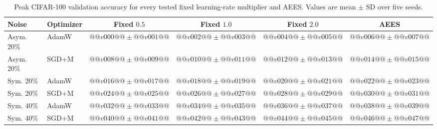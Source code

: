 \begin{table}[H]
\centering
\caption{Peak CIFAR-100 validation accuracy for every tested fixed
learning-rate multiplier and AEES. Values are mean $\pm$ SD over five seeds.}
\label{tab:appendix-all-fixed}
\scriptsize
\setlength{\tabcolsep}{3.0pt}
\renewcommand{\arraystretch}{1.03}
\begin{tabular}{llcccc}
\toprule
Noise & Optimizer & Fixed $0.5$ & Fixed $1.0$ & Fixed $2.0$ & AEES \\
\midrule
Asym. 20\% & AdamW & $@@v000@@\pm@@v001@@$ & $@@v002@@\pm@@v003@@$ & $@@v004@@\pm@@v005@@$ & $@@v006@@\pm@@v007@@$ \\
Asym. 20\% & SGD+M & $@@v008@@\pm@@v009@@$ & $@@v010@@\pm@@v011@@$ & $@@v012@@\pm@@v013@@$ & $@@v014@@\pm@@v015@@$ \\
Sym. 20\% & AdamW & $@@v016@@\pm@@v017@@$ & $@@v018@@\pm@@v019@@$ & $@@v020@@\pm@@v021@@$ & $@@v022@@\pm@@v023@@$ \\
Sym. 20\% & SGD+M & $@@v024@@\pm@@v025@@$ & $@@v026@@\pm@@v027@@$ & $@@v028@@\pm@@v029@@$ & $@@v030@@\pm@@v031@@$ \\
Sym. 40\% & AdamW & $@@v032@@\pm@@v033@@$ & $@@v034@@\pm@@v035@@$ & $@@v036@@\pm@@v037@@$ & $@@v038@@\pm@@v039@@$ \\
Sym. 40\% & SGD+M & $@@v040@@\pm@@v041@@$ & $@@v042@@\pm@@v043@@$ & $@@v044@@\pm@@v045@@$ & $@@v046@@\pm@@v047@@$ \\
\bottomrule
\end{tabular}
\end{table}

